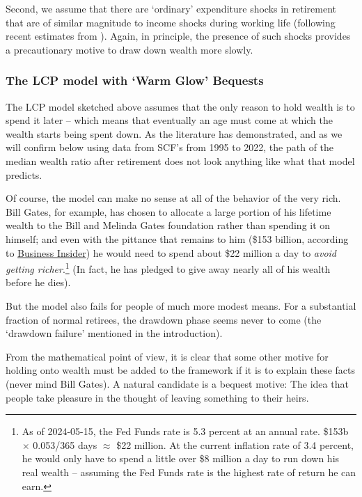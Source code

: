 \documentclass{article}
\begin{document}
Second, we assume that there are `ordinary' expenditure shocks in retirement that are of similar magnitude to income shocks during working life (following recent estimates from  \cite{flExpShocks}).  Again, in principle, the presence of such shocks provides a precautionary motive to draw down wealth more slowly.

\subsubsection{The LCP model with `Warm Glow' Bequests}

The LCP model sketched above assumes that the only reason to hold wealth is to spend it later -- which means that eventually an age must come at which the wealth starts being spent down. As the literature has demonstrated, and as we will confirm below using data from SCF's from 1995 to 2022, the path of the median wealth ratio after retirement does not look anything like what that model predicts.

Of course, the model can make no sense at all of the behavior of the very rich. Bill Gates, for example, has chosen to allocate a large portion of his lifetime wealth to the Bill and Melinda Gates foundation rather than spending it on himself; and even with the pittance that remains to him (\$153 billion, according to \href{https://www.businessinsider.com/how-bill-gates-spends-fortune}{Business Insider}) he would need to spend about \$22 million a day to \textit{avoid getting richer}.\footnote{As of 2024-05-15, the Fed Funds rate is 5.3 percent at an annual rate. \$153b $\times$ 0.053/365 days $\approx$ \$22 million. At the current inflation rate of 3.4 percent, he would only have to spend a little over \$8 million a day to run down his real wealth -- assuming the Fed Funds rate is the highest rate of return he can earn.}  (In fact, he has pledged to give away nearly all of his wealth before he dies).

But the model also fails for people of much more modest means.  For a substantial fraction of normal retirees, the drawdown phase seems never to come (the `drawdown failure' mentioned in the introduction).

From the mathematical point of view, it is clear that some other motive for holding onto wealth must be added to the framework if it is to explain these facts (never mind Bill Gates). A natural candidate is a bequest motive: The idea that people take pleasure in the thought of leaving something to their heirs.
\end{document}
